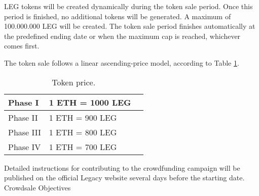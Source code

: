 LEG tokens will be created dynamically during the token sale period. Once this period is finished, no additional tokens will be generated. A maximum of 100.000.000 LEG will be created. The token sale period finishes automatically at the predefined ending date or when the maximum cap is reached, whichever comes first.

The token sale follows a linear ascending-price model, according to Table \ref{table:ico_summary}.

\begin{table}[h]
	\begin{center}
			\small
			\begin{tabular}{| l | p{5cm} | p{3cm}  |}	
		    \hline	
		    	Phase I		&  1 ETH = 1000 LEG  \\ \hline
		    	Phase II		&  1 ETH = 900 LEG  \\ \hline
		    	Phase III	&  1 ETH = 800 LEG  \\ \hline
		    	Phase IV		&  1 ETH = 700 LEG  \\ \hline		    	
			\hline	
			\end{tabular}				
	\caption{Token price.}
	\label{table:ico_summary}		
	\end{center}
\end{table}

Detailed instructions for contributing to the crowdfunding campaign will be published on the official Legacy website several days before the starting date.  
Crowdsale Objectives




